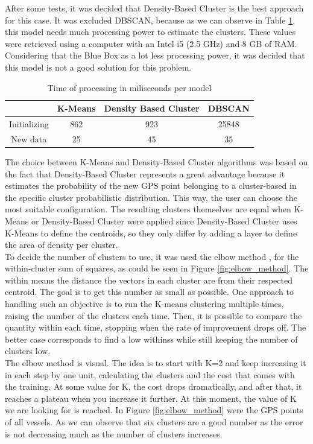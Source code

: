After some tests, it was decided that Density-Based Cluster is the best approach for this case. It was excluded DBSCAN, because as we can observe in Table \ref{table:mill_per_moodle}, this model needs much processing power to estimate the clusters. These values were retrieved using a computer with an Intel i5 (2.5 GHz) and 8 GB of RAM. Considering that the Blue Box as a lot less processing power, it was decided that this model is not a good solution for this problem.
\\

\begin {table}[H]
\begin{center}
\begin{tabular}{c|c|c|c}
& \textbf{K-Means} & \textbf{Density Based Cluster} & \textbf{DBSCAN} \\
\hline
Initializing & 862 & 923 & 25848 \\

New data & 25 & 45 & 35 
\label{table:mill_per_moodle}
\end{tabular}
\caption {Time of processing in miliseconds per model}
\end{center}
\end {table}

The choice between K-Means and Density-Based Cluster algorithms was based on the fact that Density-Based Cluster represents a great advantage because it estimates the probability of the new GPS point belonging to a cluster-based in the specific cluster probabilistic distribution. This way, the user can choose the most suitable configuration. The resulting clusters themselves are equal when K-Means or Density-Based Cluster were applied since Density-Based Cluster uses K-Means to define the centroids, so they only differ by adding a layer to define the area of density per cluster.
\\
To decide the number of clusters to use, it was used the elbow method \cite{Kodinariya2013ReviewOD}, for the within-cluster sum of squares, as could be seen in Figure \ref{fig:elbow_method}. The within means the distance the vectors in each cluster are from their respected centroid. The goal is to get this number as small as possible. One approach to handling such an objective is to run the K-means clustering multiple times, raising the number of the clusters each time. Then, it is possible to compare the quantity within each time, stopping when the rate of improvement drops off. The better case corresponds to find a low withinss while still keeping the number of clusters low.\\
The elbow method is visual. The idea is to start with K=2 and keep increasing it in each step by one unit, calculating the clusters and the cost that comes with the training. At some value for K, the cost drops dramatically, and after that, it reaches a plateau when you increase it further. At this moment, the value of K we are looking for is reached.
In Figure \ref{fig:elbow_method} were the GPS points of all vessels. As we can observe that six clusters are a good number as the error is not decreasing much as the number of clusters increases. 


